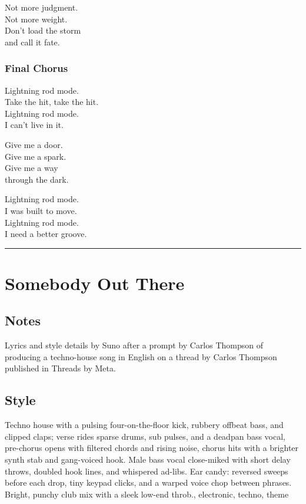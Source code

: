 Not more judgment.\\
Not more weight.\\
Don't load the storm\\
and call it fate.

\subsubsection{Final Chorus}\label{final-chorus-1}

Lightning rod mode.\\
Take the hit, take the hit.\\
Lightning rod mode.\\
I can't live in it.

Give me a door.\\
Give me a spark.\\
Give me a way\\
through the dark.

Lightning rod mode.\\
I was built to move.\\
Lightning rod mode.\\
I need a better groove.

\begin{center}\rule{0.5\linewidth}{0.5pt}\end{center}

\section{Somebody Out There}\label{somebody-out-there}

\subsection{Notes}\label{notes-8}

Lyrics and style details by Suno after a prompt by Carlos Thompson of
producing a techno-house song in English on a thread by Carlos Thompson
published in Threads by Meta.

\subsection{Style}\label{style-8}

Techno house with a pulsing four-on-the-floor kick, rubbery offbeat
bass, and clipped claps; verse rides sparse drums, sub pulses, and a
deadpan bass vocal, pre-chorus opens with filtered chords and rising
noise, chorus hits with a brighter synth stab and gang-voiced hook. Male
bass vocal close-miked with short delay throws, doubled hook lines, and
whispered ad-libs. Ear candy: reversed sweeps before each drop, tiny
keypad clicks, and a warped voice chop between phrases. Bright, punchy
club mix with a sleek low-end throb., electronic, techno, theme

